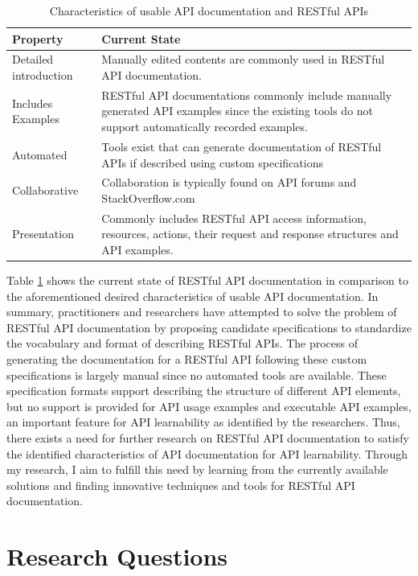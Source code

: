 \documentclass[11pt,oneside]{book}
\begin{document}
\begin{table}[!tbh]
  \caption{Characteristics of usable API documentation and RESTful APIs}
  \label{table:restful_apis}
\begin{tabular}{|p{1.5in} | p{3in}|}
\hline
Property & Current State \\
\hline
Detailed introduction &
Manually edited contents are commonly used in RESTful API documentation.
 \\
\hline
Includes Examples &
RESTful API documentations commonly include manually generated API examples since the existing tools do not support automatically recorded examples.
 \\
\hline
Automated &
Tools exist that can generate documentation of RESTful APIs if described using custom specifications \\
\hline
Collaborative &
Collaboration is typically found on API forums and StackOverflow.com \\
\hline
Presentation &
Commonly includes RESTful API access information, resources, actions, their request and response structures and API examples.\\
\hline
\end{tabular}
\end{table}


Table \ref{table:restful_apis} shows the current state of RESTful API documentation in comparison to the aforementioned desired characteristics of usable API documentation. In summary, practitioners and researchers have attempted to solve the problem of RESTful API documentation by proposing candidate specifications to standardize the vocabulary and format of describing RESTful APIs. The process of generating the documentation for a RESTful API following these custom specifications is largely manual since no automated tools are available. These specification formats support describing the structure of different API elements, but no support is provided for API usage examples and executable API examples, an important feature for API learnability as identified by the researchers. Thus, there exists a need for further research on RESTful API documentation to satisfy the identified characteristics of API documentation for API learnability. Through my research, I aim to fulfill this need by learning from the currently available solutions and finding innovative techniques and tools for RESTful API documentation.


\chapter{Research Questions}
\end{document}

